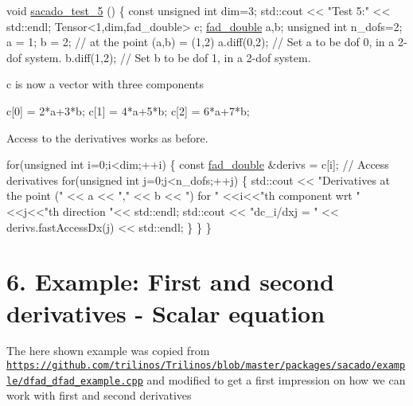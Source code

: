 \begin{DoxyCode}
\textcolor{keywordtype}{void} \hyperlink{example__code__to__be__documented_8cc_a327dbbb4ea7fc9840c46d149843a44c2}{sacado\_test\_5} ()
\{
    \textcolor{keyword}{const} \textcolor{keywordtype}{unsigned} \textcolor{keywordtype}{int} dim=3;
    std::cout << \textcolor{stringliteral}{"Test 5:"} << std::endl;
    Tensor<1,dim,fad\_double> c;
    \hyperlink{example__code__to__be__documented_8cc_a868b94676739e612d9c95940e70892a9}{fad\_double} a,b;
    \textcolor{keywordtype}{unsigned} \textcolor{keywordtype}{int} n\_dofs=2;
    a = 1; b = 2;   \textcolor{comment}{// at the point (a,b) = (1,2)}
    a.diff(0,2);  \textcolor{comment}{// Set a to be dof 0, in a 2-dof system.}
    b.diff(1,2);  \textcolor{comment}{// Set b to be dof 1, in a 2-dof system.}
\end{DoxyCode}
 c is now a vector with three components 
\begin{DoxyCode}
c[0] = 2*a+3*b;
c[1] = 4*a+5*b;
c[2] = 6*a+7*b;
\end{DoxyCode}
 Access to the derivatives works as before. 
\begin{DoxyCode}
    \textcolor{keywordflow}{for}(\textcolor{keywordtype}{unsigned} \textcolor{keywordtype}{int} i=0;i<dim;++i)
    \{
        \textcolor{keyword}{const} \hyperlink{example__code__to__be__documented_8cc_a868b94676739e612d9c95940e70892a9}{fad\_double} &derivs = c[i]; \textcolor{comment}{// Access derivatives}
        \textcolor{keywordflow}{for}(\textcolor{keywordtype}{unsigned} \textcolor{keywordtype}{int} j=0;j<n\_dofs;++j)
        \{
            std::cout << \textcolor{stringliteral}{"Derivatives at the point ("} << a << \textcolor{stringliteral}{","} << b << \textcolor{stringliteral}{") for "}
            <<i<<\textcolor{stringliteral}{"th component wrt "}<<j<<\textcolor{stringliteral}{"th direction "}<< std::endl;
            std::cout << \textcolor{stringliteral}{"dc\_i/dxj = "} << derivs.fastAccessDx(j) << std::endl;            
        \}
    \}
\}
\end{DoxyCode}
 \hypertarget{index_Ex6}{}\section{6. Example\+: First and second derivatives -\/ Scalar equation}\label{index_Ex6}
The here shown example was copied from \href{https://github.com/trilinos/Trilinos/blob/master/packages/sacado/example/dfad_dfad_example.cpp}{\tt https\+://github.\+com/trilinos/\+Trilinos/blob/master/packages/sacado/example/dfad\+\_\+dfad\+\_\+example.\+cpp} and modified to get a first impression on how we can work with first and second derivatives 
